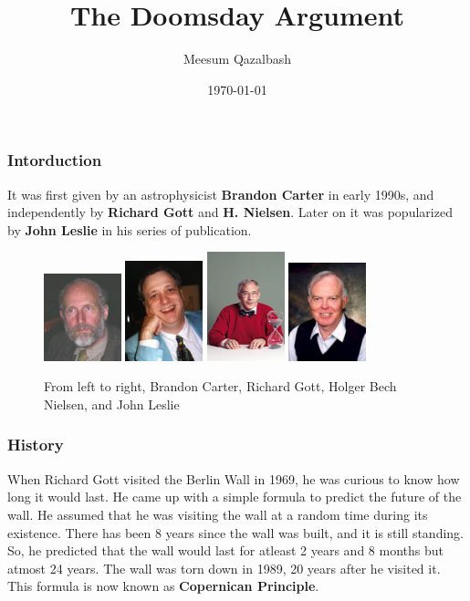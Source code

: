 \documentclass[
    10pt,
    aspectratio=169,
    xcolor={dvipsnames},
]{beamer}
\title{The Doomsday Argument}
\author{Meesum Qazalbash}
\institute{Group 5}
\date{\today}
\begin{document}
\frame{\titlepage}

\begin{frame}
    \frametitle{Intorduction}
    It was first given by an astrophysicist \textbf{Brandon Carter} in early 1990s, and independently by \textbf{Richard Gott} and \textbf{H. Nielsen}. Later on it was popularized by \textbf{John Leslie} in his series of publication.

    \begin{figure}
        \centering
        \includegraphics[width=0.2\textwidth]{BrandonCarter.jpeg}
        \includegraphics[width=0.2\textwidth]{372px-JRichardGott1989.jpeg}
        \includegraphics[width=0.2\textwidth]{341px-Holger_bech.jpeg}
        \includegraphics[width=0.2\textwidth]{John-Leslie.jpeg}
        \caption{From left to right, Brandon Carter, Richard Gott, Holger Bech Nielsen, and John Leslie}
    \end{figure}
\end{frame}

\begin{frame}
    \frametitle{History}
    When Richard Gott visited the Berlin Wall in 1969, he was curious to know how long it would last. He came up with a simple formula to predict the future of the wall. He assumed that he was visiting the wall at a random time during its existence. There has been 8 years since the wall was built, and it is still standing. So, he predicted that the wall would last for atleast 2 years and 8 months but atmost 24 years. The wall was torn down in 1989, 20 years after he visited it. This formula is now known as \textbf{Copernican Principle}.
\end{frame}
\end{document}
